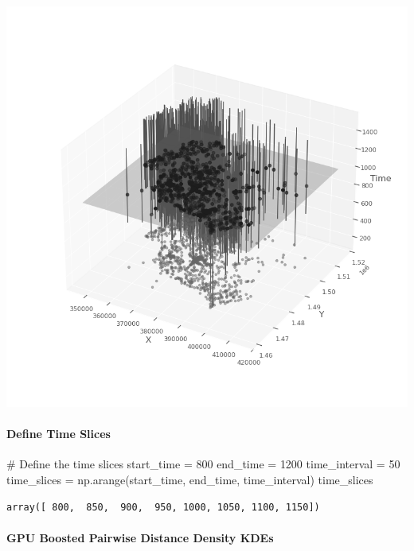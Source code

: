 \documentclass[
  11pt,
  letterpaper,
  DIV=11,
  numbers=noendperiod]{scrartcl}
\let\oldparagraph\paragraph
\renewcommand{\paragraph}[1]{\oldparagraph{#1}\mbox{}}
\newenvironment{Shaded}{\begin{snugshade}}{\end{snugshade}}
\newcommand{\CommentTok}[1]{\textcolor[rgb]{0.37,0.37,0.37}{#1}}
\newcommand{\DecValTok}[1]{\textcolor[rgb]{0.68,0.00,0.00}{#1}}
\newcommand{\NormalTok}[1]{\textcolor[rgb]{0.00,0.23,0.31}{#1}}
\newcommand{\OperatorTok}[1]{\textcolor[rgb]{0.37,0.37,0.37}{#1}}
\begin{document}
\includegraphics{analysis_files/figure-pdf/cell-7-output-1.png}

\paragraph{Define Time Slices}\label{define-time-slices}

\begin{Shaded}
\begin{Highlighting}[]
\CommentTok{\# Define the time slices}
\NormalTok{start\_time }\OperatorTok{=} \DecValTok{800}
\NormalTok{end\_time }\OperatorTok{=} \DecValTok{1200}
\NormalTok{time\_interval }\OperatorTok{=} \DecValTok{50}
\NormalTok{time\_slices }\OperatorTok{=}\NormalTok{ np.arange(start\_time, end\_time, time\_interval)}
\NormalTok{time\_slices}
\end{Highlighting}
\end{Shaded}

\begin{verbatim}
array([ 800,  850,  900,  950, 1000, 1050, 1100, 1150])
\end{verbatim}

\paragraph{GPU Boosted Pairwise Distance Density
KDEs}\label{gpu-boosted-pairwise-distance-density-kdes}
\end{document}
